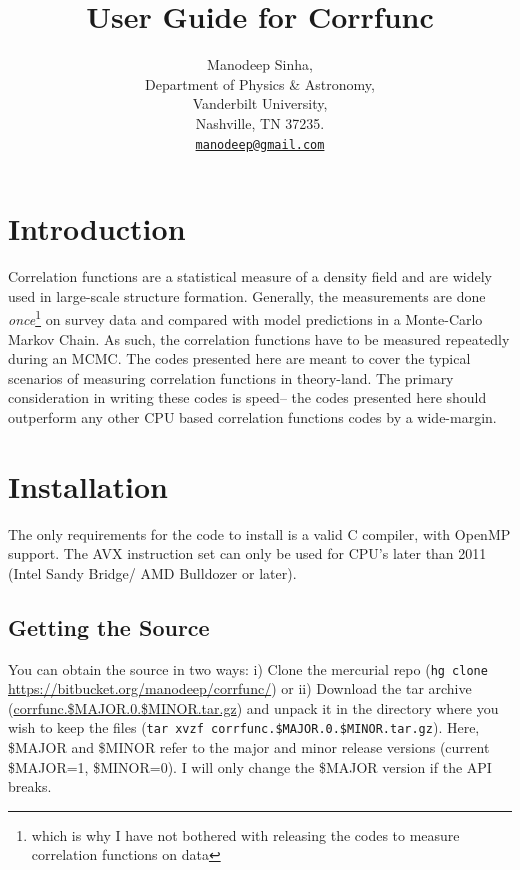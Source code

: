 \documentclass[12pt,titlepage]{article}
\let\stdsection\section
\renewcommand\section{\newpage\stdsection}
\begin{document}
\title{User Guide for Corrfunc}
\author{Manodeep Sinha, \\
  Department of Physics \& Astronomy,\\
  Vanderbilt University,\\
  Nashville, TN 37235.\\
  \href{mailto:manodeep@gmail.com}{\texttt{manodeep@gmail.com}}
}

\maketitle 

\tableofcontents
{}

\section{Introduction}
Correlation functions are a statistical measure of a density field and are widely used in large-scale structure formation. Generally, 
the measurements are done {\em once}\footnote{which is why I have not bothered with releasing the codes to measure correlation 
functions on data} on survey data and compared with model predictions in a Monte-Carlo Markov Chain. As such, the 
correlation functions have to be measured repeatedly during an MCMC. The codes presented here are meant to cover the typical scenarios 
of measuring correlation functions in theory-land. The primary consideration in writing these codes is speed\footnotemark -- the codes 
presented here should outperform any other CPU based correlation functions codes by a wide-margin. 


\section{Installation}
The only requirements for the code to install is a valid C compiler, with OpenMP support. The AVX
instruction set can only be used for CPU's later than 2011 (Intel Sandy Bridge/ AMD Bulldozer or later). 

\subsection{Getting the Source}
You can obtain the source in two ways: i) Clone the mercurial repo (\texttt{hg clone} \url{https://bitbucket.org/manodeep/corrfunc/}) 
or ii) Download the tar archive (\href{https://bitbucket.org/manodeep/corrfunc/downloads/corrfunc.1.0.0.tar.gz}{corrfunc.\$MAJOR.0.\$MINOR.tar.gz}) and 
unpack it in the directory where you wish to keep the files (\texttt{tar xvzf corrfunc.\$MAJOR.0.\$MINOR.tar.gz}). Here, \$MAJOR and \$MINOR
refer to the major and minor release versions (current \$MAJOR=1, \$MINOR=0). I will only change the \$MAJOR version if the API breaks. 
\end{document}
